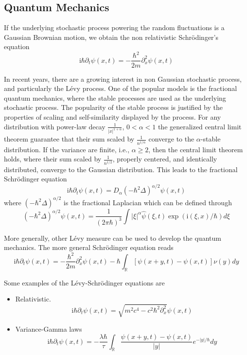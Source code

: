 \documentclass[3p,,preprint,12pt]{elsarticle}
\newcommand{\ii}[0]{\mathrm{i}}
\newcommand{\RR}[0]{\mathbb{R}}
\theoremstyle{definition}
\begin{document}
\subsection{Quantum Mechanics}

If the underlying stochastic process powering the random fluctuations is a Gaussian Brownian motion, we obtain the non relativistic Schr\"odinger's equation~\cite{laskin2010principles,hasan2018tunneling,garbaczewski1995schrodinger,laskin2000fractional}
\begin{equation}
	\ii \hbar \partial_t \psi(x,t) = -\frac{\hbar^2}{2m}\partial^2_{x} \psi(x,t)
\end{equation}

In recent years, there are a growing interest in non Gaussian stochastic process, and particularly the L\'evy process. One of the popular models is the fractional quantum mechanics, where the stable processes are used as the underlying stochastic process. The popularity of the stable process is justified by the properties of scaling and self-similarity displayed by the process. For any distribution with power-law decay $\frac{1}{|x|^{1+\alpha}}$, $0<\alpha<1$ the generalized central limit theorem guarantee that their sum scaled by $\frac{1}{n^{1/\alpha}}$ converge to the $\alpha$-stable distribution. If the variance are finite, i.e., $\alpha\geq 2$, then the central limit theorem holds, where  their sum scaled by $\frac{1}{n^{1/2}}$, properly centered, and identically distributed, converge to the Gaussian distribution.  This leads to the fractional Schr\"odinger equation
\begin{equation}
	\ii \hbar \partial_t \psi(x,t) = D_\alpha (-\hbar^2 \Delta)^{\alpha/2}\psi(x,t)
\end{equation}
where $(-\hbar^2 \Delta)^{\alpha/2}$ is the fractional Laplacian which can be defined through
\begin{equation}
	(-\hbar^2 \Delta)^{\alpha/2}\psi(x,t) = \frac{1}{(2\pi \hbar)^3}\int |\xi|^\alpha \hat \psi(\xi,t) \exp(\ii (\xi,x)/\hbar)d\xi
\end{equation}


More generally, other L\'evy measure can be used to develop the quantum mechanics. The more general Schr\"odinger equation reads
\begin{equation}
	\ii \hbar\partial_t \psi(x,t) = -\frac{\hbar^2}{2m}\partial_x^2 \psi(x,t) - \hbar  \int_\RR [\psi(x+y,t)-\psi(x,t)]\nu(y)dy
\end{equation}

Some examples of the L\'evy-Schr\"odinger equations are
\begin{itemize}
	\item Relativistic.
	\begin{equation}
		\ii \hbar\partial_t \psi(x,t) = \sqrt{m^2c^4-c^2\hbar^2\partial_x^2} \psi(x,t)
	\end{equation}
	\item Variance-Gamma laws
	\begin{equation}
		\ii \hbar\partial_t \psi(x,t) = -\frac{\lambda\hbar}{\tau}\int_\RR\frac{\psi(x+y,t)-\psi(x,t)}{|y|}e^{-|y|/\hbar}dy
	\end{equation}

\end{itemize}
\end{document}
